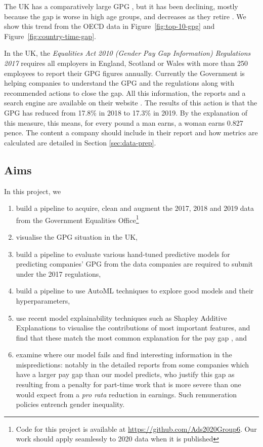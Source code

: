 The UK has a comparatively large GPG \cite{ONS2018}, but it has been declining, mostly because the gap is worse in high age groups, and decreases as they retire \cite{brynin2017gender}. We show this trend from the OECD data in Figure\ \ref{fig:top-10-gpg} and Figure\ \ref{fig:country-time-gap}. 

In the UK, the \emph{Equalities Act 2010 (Gender Pay Gap Information) Regulations 2017} \cite{equality-act-gpg-regulations} requires all  employers in England, Scotland or Wales with more than 250 employees to report their GPG figures annually.
Currently the Government is helping companies to understand the GPG and the regulations along with recommended actions to close the gap. All this information, the reports and a search engine are available on their website \cite{govuk-gender-pay-gap-service}. The results of this action is that the GPG has reduced from 17.8\% in 2018 to 17.3\% in 2019. By the explanation of this measure, this means, for every pound a man earns, a woman earns 0.827 pence. The content a company should include in their report and how metrics are calculated are detailed in Section \ref{sec:data-prep}.

\subsection{Aims}
In this project, we 

\begin{enumerate}
\item build a pipeline to acquire, clean and augment the 2017, 2018 and 2019 data from the Government Equalities Office\footnote{Code for this project is available at \url{https://github.com/Ads2020Group6}. Our work should apply seamlessly to 2020 data when it is published}
\item visualise the GPG situation in the UK,
\item build a pipeline to evaluate various hand-tuned predictive models for predicting
companies' GPG from the data companies are required to submit under the 2017 regulations,
\item build a pipeline to use AutoML techniques \cite{tpot-automl} to explore good models and their hyperparameters,
\item use recent model explainability techniques such as Shapley 
Additive Explanations \cite{Lundberg2017} to visualise the contributions of most important features, and find that these match the most common explanation for the pay gap \cite{gov-equalities-office-research-report}, and
\item examine where our model fails and find interesting information in the mispredictions: notably in the detailed reports from some companies which have a larger pay gap than our model predicts, who justify this gap as resulting from a penalty for part-time work that is more severe than one would expect from a \emph{pro rata} reduction in earnings. Such remuneration policies entrench gender inequality.

    
    
\end{enumerate}
